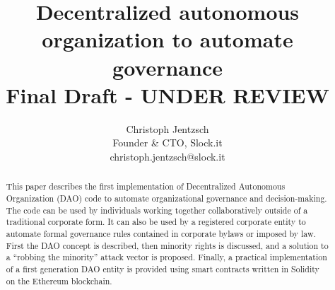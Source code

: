\documentclass[9pt,oneside]{amsart}
\title{Decentralized autonomous organization to automate governance\\ {\smaller \textbf{Final Draft - UNDER REVIEW}}}
\author{
    Christoph Jentzsch\\
    Founder \& CTO, Slock.it\\
    christoph.jentzsch@slock.it
}
\begin{document}
\begin{abstract}
This paper describes the first implementation of Decentralized Autonomous Organization (DAO) code to automate organizational governance and decision-making. The code can be used by individuals working together collaboratively outside of a traditional corporate form. It can also be used by a registered corporate entity to automate formal governance rules contained in corporate bylaws or imposed by law. First the DAO concept is described, then minority rights is discussed, and a solution to a ``robbing the minority'' attack vector is proposed. Finally, a practical implementation of a first generation DAO entity is provided using smart contracts written in Solidity on the Ethereum blockchain.
\end{abstract}

\maketitle
\end{document}
